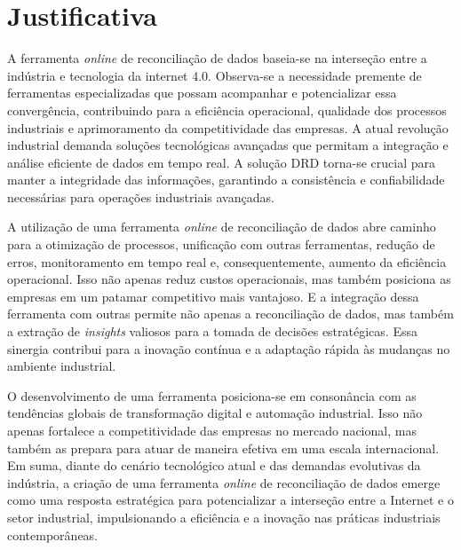 \section{Justificativa}

A ferramenta \textit{online} de reconciliação de dados baseia-se na interseção entre a indústria e tecnologia da internet 4.0. Observa-se a necessidade premente de ferramentas especializadas que possam acompanhar e potencializar essa convergência, contribuindo para a eficiência operacional, qualidade dos processos industriais e aprimoramento da competitividade das empresas. A atual revolução industrial demanda soluções tecnológicas avançadas que permitam a integração e análise eficiente de dados em tempo real. A solução DRD torna-se crucial para manter a integridade das informações, garantindo a consistência e confiabilidade necessárias para operações industriais avançadas.

A utilização de uma ferramenta \textit{online} de reconciliação de dados abre caminho para a otimização de processos, unificação com outras ferramentas, redução de erros, monitoramento em tempo real e, consequentemente, aumento da eficiência operacional. Isso não apenas reduz custos operacionais, mas também posiciona as empresas em um patamar competitivo mais vantajoso. E a integração dessa ferramenta com outras permite não apenas a reconciliação de dados, mas também a extração de \textit{insights} valiosos para a tomada de decisões estratégicas. Essa sinergia contribui para a inovação contínua e a adaptação rápida às mudanças no ambiente industrial.

O desenvolvimento de uma ferramenta posiciona-se em consonância com as tendências globais de transformação digital e automação industrial. Isso não apenas fortalece a competitividade das empresas no mercado nacional, mas também as prepara para atuar de maneira efetiva em uma escala internacional. Em suma, diante do cenário tecnológico atual e das demandas evolutivas da indústria, a criação de uma ferramenta \textit{online} de reconciliação de dados emerge como uma resposta estratégica para potencializar a interseção entre a Internet e o setor industrial, impulsionando a eficiência e a inovação nas práticas industriais contemporâneas.



